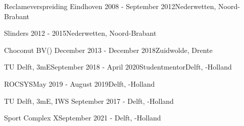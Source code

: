 \begin{rSection}{}
  \begin{experienceItem}
    {Reclameverspreiding Eindhoven}{ 2008 - September 2012}{}{Nederwetten, Noord-Brabant}
  \end{experienceItem}

  \begin{experienceItem}
    {Slinders}{ 2012 -  2015}{{}}{Nederwetten, Noord-Brabant}
  \end{experienceItem}

  \begin{experienceItem}
    {Choconut BV}{() December 2013 - December 2018}{}{Zuidwolde, Drente}
  \end{experienceItem}

  \begin{experienceItem}
    {TU Delft, 3mE}{September 2018 - April 2020}{Studentmentor}{Delft, -Holland}
  \end{experienceItem}

  \begin{experienceItem}
    {ROCSYS}{May 2019 - August 2019}{}{Delft, -Holland}
  \end{experienceItem}

  \begin{experienceItem}
    {TU Delft, 3mE, IWS }{September 2017 - }{}{Delft, -Holland}
  \end{experienceItem}

  \begin{experienceItem}
    {Sport Complex X}{September 2021 - }{}{Delft, -Holland}
  \end{experienceItem}

\end{rSection}


